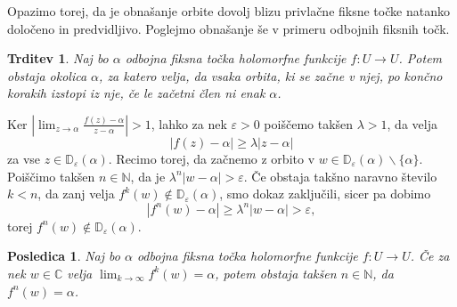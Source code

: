\documentclass[12pt,a4paper]{amsart}
\theoremstyle{definition} %
\theoremstyle{plain} %
\newtheorem{trditev}[definicija]{Trditev}
\newtheorem{posledica}[definicija]{Posledica}
\newcommand{\N}{\mathbb N}
\newcommand{\CC}{\mathbb C}
\newcommand{\D}{\mathbb D} %
\begin{document}
Opazimo torej, da je obnašanje orbite dovolj blizu privlačne fiksne točke natanko določeno in predvidljivo.
Poglejmo obnašanje še v primeru odbojnih fiksnih točk.

\begin{trditev}
Naj bo $\alpha$ odbojna fiksna točka holomorfne funkcije $f \colon U \to U$.
Potem obstaja okolica $\alpha$, za katero velja, da vsaka orbita, ki se začne v njej,
po končno korakih izstopi iz nje, če le začetni člen ni enak $\alpha$.
\end{trditev}

\proof
Ker $|\lim_{z\to\alpha}\frac{f(z) - \alpha}{z - \alpha}| > 1$, lahko za nek $\varepsilon > 0$
poiščemo takšen $\lambda > 1$, da velja 
$$|f(z) - \alpha| \geq \lambda |z - \alpha|$$
za vse $z \in \D_\varepsilon(\alpha)$.
Recimo torej, da začnemo z orbito v $w \in \D_\varepsilon(\alpha) \smallsetminus \{\alpha\}$.
Poiščimo takšen $n\in\N$, da je $\lambda^n |w - \alpha| > \varepsilon$. 
Če obstaja takšno naravno število $k < n$, da zanj velja $f^k(w) \notin \D_\varepsilon(\alpha)$, smo dokaz zaključili, sicer pa dobimo
$$|f^n(w) - \alpha| \geq \lambda^n|w - \alpha|  > \varepsilon,$$ 
torej $f^n(w) \notin \D_\varepsilon(\alpha)$.
\endproof

\begin{posledica}\label{pos:odbojnaKonv}
Naj bo $\alpha$ odbojna fiksna točka holomorfne funkcije $f \colon U \to U$.
Če za nek $w \in \CC$ velja $\lim_{k\to\infty} f^k(w) = \alpha$, potem obstaja takšen $n\in\N$,
da $f^n(w) = \alpha$.
\end{posledica}
\end{document}
